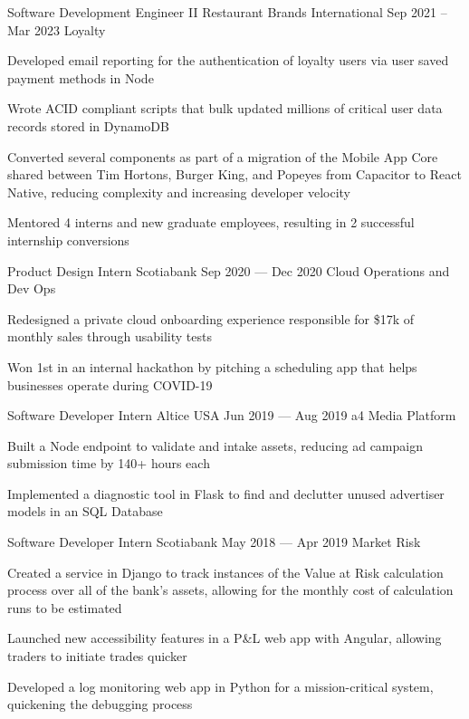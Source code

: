 \begin{cventries}
  \cventry
      {Software Development Engineer II}
      {Restaurant Brands International}
      {}
      {Sep 2021 -- Mar 2023}
      {Loyalty}
      {
        \begin{cvitems}
          \item {Developed email reporting for the authentication of loyalty users via user saved payment methods in Node}
          \item {Wrote ACID compliant scripts that bulk updated millions of critical user data records stored in DynamoDB}
          \item {Converted several components as part of a migration of the Mobile App Core shared between Tim Hortons, Burger King, and Popeyes from Capacitor to React Native, reducing complexity and increasing developer velocity}
          \item {Mentored 4 interns and new graduate employees, resulting in 2 successful internship conversions}
        \end{cvitems}
      }
  \cventry
    {Product Design Intern}
    {Scotiabank}
    {}
    {Sep 2020 --- Dec 2020}
    {Cloud Operations and Dev Ops}
    {
      \begin{cvitems}
        \item {Redesigned a private cloud onboarding experience responsible for \$17k of monthly sales through usability tests}
        \item {Won 1st in an internal hackathon by pitching a scheduling app that helps businesses operate during COVID-19}
      \end{cvitems}
    }

  \cventry
    {Software Developer Intern}
    {Altice USA}
    {}
    {Jun 2019 --- Aug 2019}
    {a4 Media Platform}
    {
    \begin{cvitems}
      \item {Built a Node endpoint to validate and intake assets, reducing ad campaign submission time by 140+ hours each}
      \item {Implemented a diagnostic tool in Flask to find and declutter unused advertiser models in an SQL Database}
    \end{cvitems}
    }

  \cventry
    {Software Developer Intern}
    {Scotiabank}
    {}
    {May 2018 --- Apr 2019}
    {Market Risk}
    {
      \begin{cvitems}
        \item {Created a service in Django to track instances of the Value at Risk calculation process over all of the bank's assets, allowing for the monthly cost of calculation runs to be estimated}
        \item {Launched new accessibility features in a P\&L web app with Angular, allowing traders to initiate trades quicker}
        \item {Developed a log monitoring web app in Python for a mission-critical system, quickening the debugging process}
      \end{cvitems}
    }
\end{cventries}
